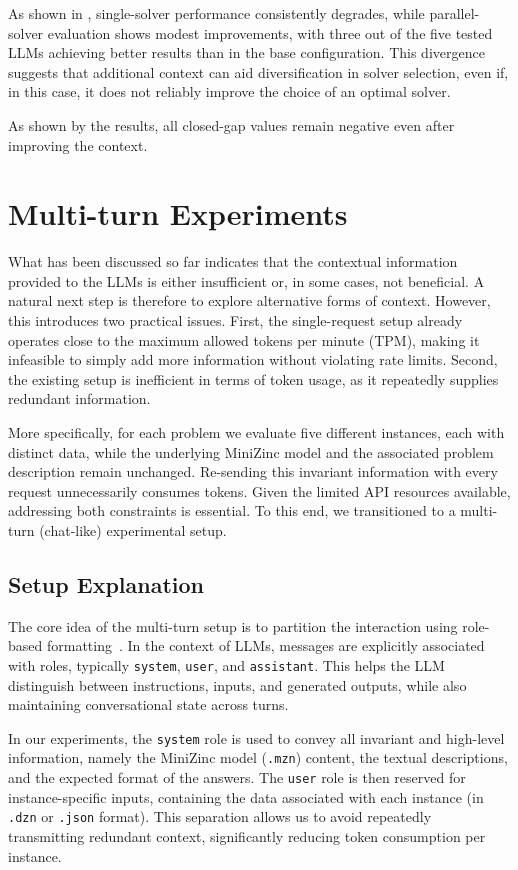 \documentclass[../../main]{subfiles}
\begin{document}
As shown in , single-solver performance consistently degrades, while parallel-solver evaluation shows modest improvements, with three out of the five tested LLMs achieving better results than in the base configuration. This divergence suggests that additional context can aid diversification in solver selection, even if, in this case, it does not reliably improve the choice of an optimal solver.

As shown by the results, all closed-gap values remain negative even after improving the context.

\section{Multi-turn Experiments}
What has been discussed so far indicates that the contextual information provided to the LLMs is either insufficient or, in some cases, not beneficial. A natural next step is therefore to explore alternative forms of context. However, this introduces two practical issues. First, the single-request setup already operates close to the maximum allowed tokens per minute (TPM), making it infeasible to simply add more information without violating rate limits. Second, the existing setup is inefficient in terms of token usage, as it repeatedly supplies redundant information.

More specifically, for each problem we evaluate five different instances, each with distinct data, while the underlying MiniZinc model and the associated problem description remain unchanged. Re-sending this invariant information with every request unnecessarily consumes tokens. Given the limited API resources available, addressing both constraints is essential. To this end, we transitioned to a multi-turn (chat-like) experimental setup.

\subsection{Setup Explanation}
The core idea of the multi-turn setup is to partition the interaction using role-based formatting~\cite{RBFormatting}. In the context of LLMs, messages are explicitly associated with roles, typically \texttt{system}, \texttt{user}, and \texttt{assistant}. This helps the LLM distinguish between instructions, inputs, and generated outputs, while also maintaining conversational state across turns.

In our experiments, the \texttt{system} role is used to convey all invariant and high-level information, namely the MiniZinc model (\texttt{.mzn}) content, the textual descriptions, and the expected format of the answers. The \texttt{user} role is then reserved for instance-specific inputs, containing the data associated with each instance (in \texttt{.dzn} or \texttt{.json} format). This separation allows us to avoid repeatedly transmitting redundant context, significantly reducing token consumption per instance.
\end{document}
